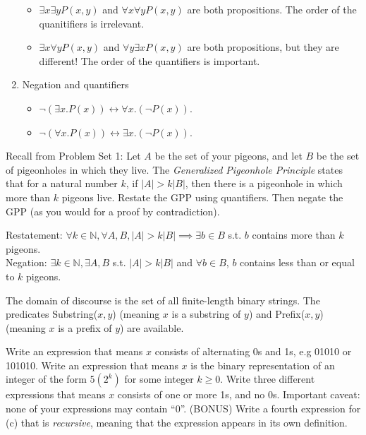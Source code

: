 \documentclass[solution, letterpaper]{cs20inclass}
\begin{document}
\begin{enumerate}
\begin{itemize}
\item $\exists x \exists y P(x,y)$ and $\forall x \forall y P(x,y)$ are both propositions. The order of the quanitifiers is irrelevant.

\item $\exists x \forall y P(x,y)$ and $\forall y \exists x P(x,y)$ are both propositions, but they are different! The order of the quantifiers is important. 

\end{itemize}

\item Negation and quantifiers
\begin{itemize}
\item $\neg (\exists x. P(x)) \leftrightarrow \forall x. (\neg P(x))$.
\item $\neg (\forall x. P(x)) \leftrightarrow \exists x. (\neg P(x))$.

\end{itemize}

\end{enumerate}

\problem Recall from Problem Set 1: Let $A$ be the set of your pigeons, and let $B$ be the set of pigeonholes in which they live. The \textit{Generalized Pigeonhole Principle} states that for a natural number $k$, if $|A| > k|B|$, then there is a pigeonhole in which more than $k$ pigeons live. Restate the GPP using quantifiers. Then negate the GPP (as you would for a proof by contradiction).

\begin{solution}
Restatement:
$\forall k \in \mathbb{N}, \forall A, B, |A| > k|B| \implies \exists b \in B$ s.t. $b$ contains more than $k$ pigeons.\\
Negation:
$\exists k \in \mathbb{N}, \exists A, B$ s.t. $|A| > k|B|$ and $\forall b \in B$, $b$ contains less than or equal to $k$ pigeons.
\end{solution}

\problem
 The domain of discourse is the set of all finite-length binary strings. The predicates Substring($x,y$) (meaning $x$ is a substring of $y$) and Prefix($x,y$) (meaning $x$ is a prefix of $y$) are available.

\subproblem  Write an expression that means $x$ consists of alternating 0s and 1s, e.g 01010 or 101010.
\subproblem  Write an expression that means $x$ is the binary representation of an integer of the form $5(2^k)$ for some integer $k \geq 0$.
\subproblem Write three different expressions that means $x$ consists of one or more 1s, and no 0s. Important caveat: none of your expressions may contain ``0''.
\subproblem (BONUS) Write a fourth expression for (c) that is \textit{recursive}, meaning that the expression appears in its own definition.
\end{document}
